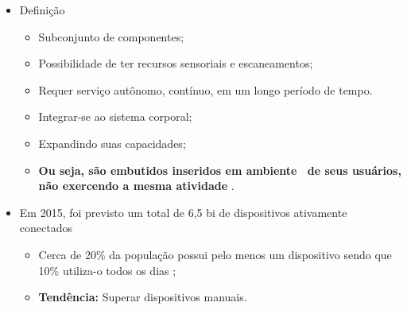       \begin{frame}{\Wearables} \vspace{-1em}
         \begin{itemize} \setlength{\itemsep}{1.4em}
            \item Definição
            \begin{itemize} \setlength{\itemsep}{0.4em}
               \item Subconjunto de componentes;
               \item Possibilidade de ter recursos sensoriais e escaneamentos;
               \item Requer serviço autônomo, contínuo, em um longo período de tempo.
               \item Integrar-se ao sistema corporal;
               \item Expandindo suas capacidades;
               \item \textbf{Ou seja, são embutidos inseridos em ambiente \mobile\ de seus usuários, não exercendo a mesma atividade} \cite{Plessl2003}. 
            \end{itemize}
         
            
            \item Em 2015, foi previsto um total de 6,5 bi de dispositivos ativamente conectados \cite{RobvanderMeulen2015}
            \begin{itemize} \setlength{\itemsep}{0.4em}
               \item Cerca de 20\% da população possui pelo menos um dispositivo sendo que 10\% utiliza-o todos os dias \cite{lee2016information};
               \item \textbf{Tendência:} Superar dispositivos manuais.
            \end{itemize}
            
         \end{itemize}
      \end{frame}  
     
